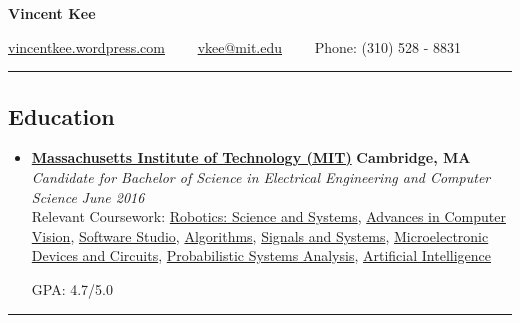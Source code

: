 \documentclass[10pt,letterpaper]{article}
\begin{document}
\begin{center}
{\huge \textbf{Vincent Kee}}

\href{http://vincentkee.wordpress.com}{vincentkee.wordpress.com}\ \ \textbullet
\ \ \href{mailto:vkee@mit.edu}{vkee@mit.edu}\ \ \textbullet
\ \  Phone: (310) 528 - 8831
\end{center}

\hrule
\vspace{-0.6em}

\subsection*{Education}
  \begin{itemize}
    \parskip=-0.1em

    \item[]
    {\href{http://mit.edu/}{\textbf{Massachusetts Institute of Technology (MIT)}} \hfill
      \textbf{Cambridge, MA}}
    \\
    {\emph{Candidate for Bachelor of Science in Electrical Engineering and Computer Science} \hfill
      \emph{June 2016}}\\
      Relevant Coursework: \href{http://student.mit.edu/catalog/search.cgi?search=6.141&style=verbatim}{Robotics: Science and Systems}, \href{http://student.mit.edu/catalog/search.cgi?search=6.869&style=verbatim}{Advances in Computer Vision}, \href{http://student.mit.edu/catalog/search.cgi?search=6.170&style=verbatim}{Software Studio}, \href{http://student.mit.edu/catalog/search.cgi?search=6.006&style=verbatim}{Algorithms}, \href{http://student.mit.edu/catalog/search.cgi?search=6.003&style=verbatim}{Signals and Systems}, \href{http://student.mit.edu/catalog/search.cgi?search=6.012&style=verbatim}{Microelectronic Devices and Circuits}, \href{http://student.mit.edu/catalog/search.cgi?search=6.041&style=verbatim}{Probabilistic Systems Analysis}, \href{http://student.mit.edu/catalog/search.cgi?search=6.034&style=verbatim}{Artificial Intelligence}

GPA: 4.7/5.0

  \end{itemize}

\hrule
\vspace{-0.6em}

\end{document}
